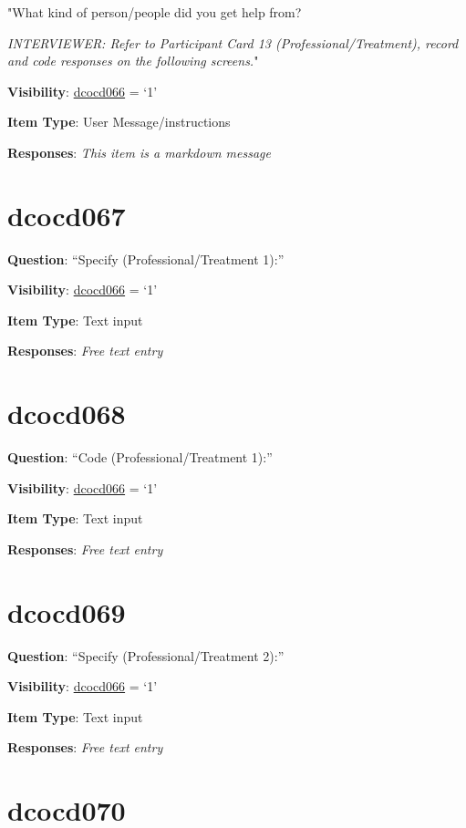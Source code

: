 \documentclass[]{book}
\begin{document}
"What kind of person/people did you get help from?

\emph{INTERVIEWER: Refer to Participant Card 13 (Professional/Treatment), record and code responses on the following screens.}"

\textbf{Visibility}: \protect\hyperlink{dcocd066}{dcocd066} = `1'

\textbf{Item Type}: User Message/instructions

\textbf{Responses}: \emph{This item is a markdown message}

\hypertarget{dcocd067}{%
\section{dcocd067}\label{dcocd067}}

\textbf{Question}: ``Specify (Professional/Treatment 1):''

\textbf{Visibility}: \protect\hyperlink{dcocd066}{dcocd066} = `1'

\textbf{Item Type}: Text input

\textbf{Responses}: \emph{Free text entry}

\hypertarget{dcocd068}{%
\section{dcocd068}\label{dcocd068}}

\textbf{Question}: ``Code (Professional/Treatment 1):''

\textbf{Visibility}: \protect\hyperlink{dcocd066}{dcocd066} = `1'

\textbf{Item Type}: Text input

\textbf{Responses}: \emph{Free text entry}

\hypertarget{dcocd069}{%
\section{dcocd069}\label{dcocd069}}

\textbf{Question}: ``Specify (Professional/Treatment 2):''

\textbf{Visibility}: \protect\hyperlink{dcocd066}{dcocd066} = `1'

\textbf{Item Type}: Text input

\textbf{Responses}: \emph{Free text entry}

\hypertarget{dcocd070}{%
\section{dcocd070}\label{dcocd070}}
\end{document}
